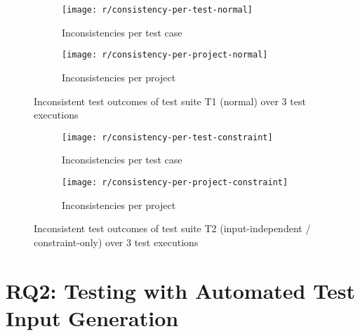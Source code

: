 \begin{figure}[htpb]
    \centering
    \begin{subfigure}{.8\textwidth}
        \texttt{[image: r/consistency-per-test-normal]}
        \caption{Inconsistencies per test case}
        \label{fig:consistency_per_test_normal}
    \end{subfigure}

    \bigskip

    \begin{subfigure}{.8\textwidth}
        \texttt{[image: r/consistency-per-project-normal]}
        \caption{Inconsistencies per project}
        \label{fig:consistency_per_project_normal}
    \end{subfigure}
    \caption{Inconsistent test outcomes of test suite T1 (normal) over 3 test executions}
    \label{fig:consistency_normal}
\end{figure}

\begin{figure}[htpb]
    \centering
    \begin{subfigure}{.8\textwidth}
        \texttt{[image: r/consistency-per-test-constraint]}
        \caption{Inconsistencies per test case}
        \label{fig:consistency_per_test_constraint}
    \end{subfigure}

    \bigskip

    \begin{subfigure}{.8\textwidth}
        \texttt{[image: r/consistency-per-project-constraint]}
        \caption{Inconsistencies per project}
        \label{fig:consistency_per_project_constraint}
    \end{subfigure}
    \caption{Inconsistent test outcomes of test suite T2 (input-independent / constraint-only) over 3 test executions}
    \label{fig:consistency_constraint}
\end{figure}


\section{RQ2: Testing with Automated Test Input Generation}

